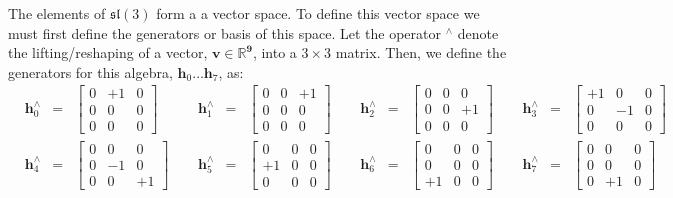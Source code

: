 The elements of \(\mathfrak{sl}(3)\) form a a vector space. To define this vector space we must first define the generators or basis of this space. Let the operator \(^{\wedge}\) denote the lifting/reshaping of a vector, \(\mathbf{v\in\mathbb{R}^{9}}\), into a \(3\times3\) matrix. Then, we define the generators for this algebra, \(\mathbf{h}_{0}\dotsc\mathbf{h}_{7}\), as:
\begin{align*}
    &\mathbf{h}_{0}^{\wedge}&=&\begin{bmatrix}0 & +1 & 0\\
                                            0 & 0 & 0\\
                                            0 & 0 & 0      \end{bmatrix}&\ \
    &\mathbf{h}_{1}^{\wedge}&=&\begin{bmatrix}0 & 0 & +1\\
                                            0 & 0 & 0\\
                                            0 & 0 & 0      \end{bmatrix}&\ \
    &\mathbf{h}_{2}^{\wedge}&=&\begin{bmatrix}0 & 0 & 0\\
                                            0 & 0 & +1\\
                                            0 & 0 & 0      \end{bmatrix}&\ \
    &\mathbf{h}_{3}^{\wedge}&=&\begin{bmatrix}+1 & 0 & 0\\
                                            0 & -1 & 0\\
                                            0 & 0 & 0      \end{bmatrix}&
    \\
    &\mathbf{h}_{4}^{\wedge}&=&\begin{bmatrix}0 & 0 & 0\\
                                            0 & -1 & 0\\
                                            0 & 0 & +1      \end{bmatrix}&\ \
    &\mathbf{h}_{5}^{\wedge}&=&\begin{bmatrix}0 & 0 & 0\\
                                            +1 & 0 & 0\\
                                            0 & 0 & 0      \end{bmatrix}&\ \
    &\mathbf{h}_{6}^{\wedge}&=&\begin{bmatrix}0 & 0 & 0\\
                                            0 & 0 & 0\\
                                            +1 & 0 & 0      \end{bmatrix}&\ \
    &\mathbf{h}_{7}^{\wedge}&=&\begin{bmatrix}0 & 0 & 0\\
                                            0 & 0 & 0\\
                                            0 & +1 & 0      \end{bmatrix}&
\end{align*}

